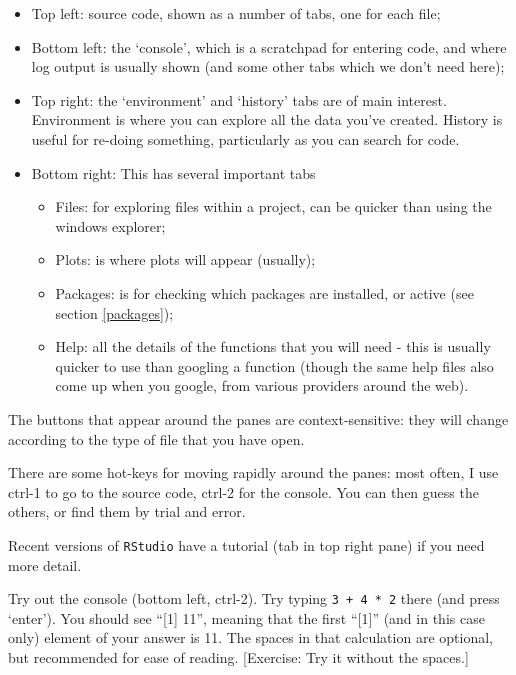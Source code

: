 \documentclass[
]{book}
\providecommand{\tightlist}{%
  \setlength{\itemsep}{0pt}\setlength{\parskip}{0pt}}
\begin{document}
\begin{itemize}
\tightlist
\item
  Top left: source code, shown as a number of tabs, one for each file;
\item
  Bottom left: the `console', which is a scratchpad for entering code, and where log output is usually shown (and some other tabs which we don't need here);
\item
  Top right: the `environment' and `history' tabs are of main interest. Environment is where you can explore all the data you've created. History is useful for re-doing something, particularly as you can search for code.
\item
  Bottom right: This has several important tabs

  \begin{itemize}
  \tightlist
  \item
    Files: for exploring files within a project, can be quicker than using the windows explorer;
  \item
    Plots: is where plots will appear (usually);
  \item
    Packages: is for checking which packages are installed, or active (see section \ref{packages});
  \item
    Help: all the details of the functions that you will need - this is usually quicker to use than googling a function (though the same help files also come up when you google, from various providers around the web).
  \end{itemize}
\end{itemize}

The buttons that appear around the panes are context-sensitive: they will change according to the type of file that you have open.

There are some hot-keys for moving rapidly around the panes: most often, I use ctrl-1 to go to the source code, ctrl-2 for the console. You can then guess the others, or find them by trial and error.

Recent versions of \texttt{RStudio} have a tutorial (tab in top right pane) if you need more detail.

Try out the console (bottom left, ctrl-2). Try typing \texttt{3\ +\ 4\ *\ 2} there (and press `enter'). You should see ``{[}1{]} 11'', meaning that the first ``{[}1{]}'' (and in this case only) element of your answer is 11. The spaces in that calculation are optional, but recommended for ease of reading. {[}Exercise: Try it without the spaces.{]}
\end{document}
